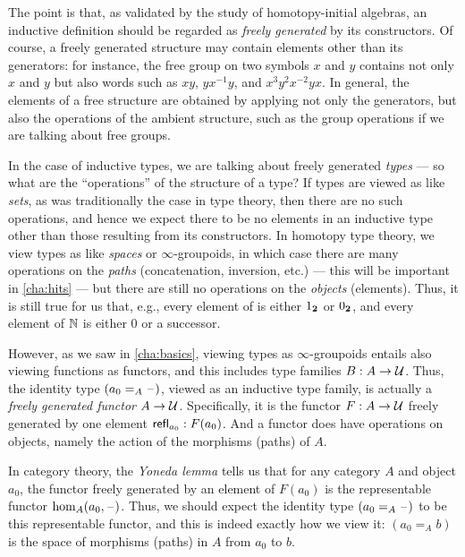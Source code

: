 %
%
The point is that, as validated by the study of homotopy-initial algebras, an inductive definition should be regarded as \emph{freely generated} by its constructors.
Of course, a freely generated structure may contain elements other than its generators: for instance, the free group on two symbols $x$ and $y$ contains not only $x$ and $y$ but also words such as $xy$, $yx^{-1}y$, and $x^3y^2x^{-2}yx$.
In general, the elements of a free structure are obtained by applying not only the generators, but also the operations of the ambient structure, such as the group operations if we are talking about free groups.

In the case of inductive types, we are talking about freely generated \emph{types} --- so what are the ``operations'' of the structure of a type?
If types are viewed as like \emph{sets}, as was traditionally the case in type theory, then there are no such operations, and hence we expect there to be no elements in an inductive type other than those resulting from its constructors.
In homotopy type theory, we view types as like \emph{spaces} or $\infty$-groupoids,%
in which case there are many operations on the \emph{paths} (concatenation, inversion, etc.) --- this will be important in \autoref{cha:hits} --- but there are still no operations on the \emph{objects} (elements).
Thus, it is still true for us that, e.g., every element of \bool is either ${1_{\mathbf{2}}}$ or ${0_{\mathbf{2}}}$, and every element of $\mathbb{N}$ is either $0$ or a successor.

However, as we saw in \autoref{cha:basics}, viewing types as $\infty$-groupoids entails also viewing functions as functors, and this includes type families $B:A\to\mathcal{U}$.
Thus, the identity type $(a_0 =_A \mathord{\hspace{1pt}\text{--}\hspace{1pt}})$, viewed as an inductive type family, is actually a \emph{freely generated functor} $A\to\mathcal{U}$.
Specifically, it is the functor $F:A\to\mathcal{U}$ freely generated by one element $\mathsf{refl}_{a_0}: F(a_0)$.
And a functor does have operations on objects, namely the action of the morphisms (paths) of $A$.

In category theory, the \emph{Yoneda lemma} tells us that for any category $A$ and object $a_0$, the functor freely generated by an element of $F(a_0)$ is the representable functor $\hom_A(a_0,\mathord{\hspace{1pt}\text{--}\hspace{1pt}})$.
Thus, we should expect the identity type $(a_0 =_A \mathord{\hspace{1pt}\text{--}\hspace{1pt}})$ to be this representable functor, and this is indeed exactly how we view it: $(a_0 =_A b)$ is the space of morphisms (paths) in $A$ from $a_0$ to $b$.

